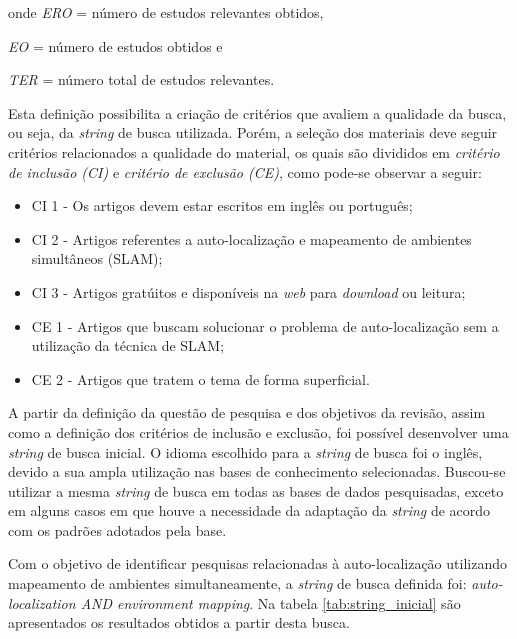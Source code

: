 		onde \textit{ERO} = número de estudos relevantes obtidos,
		
		\textit{EO} = número de estudos obtidos e

		\textit{TER} = número total de estudos relevantes.

		Esta definição possibilita a criação de critérios que avaliem a qualidade da busca, ou seja, da \textit{string} de busca utilizada. Porém, a seleção dos materiais deve seguir critérios relacionados a qualidade do material, os quais são divididos em \textit{critério de inclusão (CI)} e \textit{critério de exclusão (CE)}, como pode-se observar a seguir:

		\begin{itemize}
			\item CI 1 - Os artigos devem estar escritos em inglês ou português;
			\item CI 2 - Artigos referentes a auto-localização e mapeamento de ambientes simultâneos (SLAM);
			\item CI 3 - Artigos gratúitos e disponíveis na \textit{web} para \textit{download} ou leitura;
			\item CE 1 - Artigos que buscam solucionar o problema de auto-localização sem a utilização da técnica de SLAM;
			\item CE 2 - Artigos que tratem o tema de forma superficial. 
		\end{itemize}

		A partir da definição da questão de pesquisa e dos objetivos da revisão, assim como a definição dos critérios de inclusão e exclusão, foi possível desenvolver uma \textit{string} de busca inicial. O idioma escolhido para a \textit{string} de busca foi o inglês, devido a sua ampla utilização nas bases de conhecimento selecionadas. Buscou-se utilizar a mesma \textit{string} de busca em todas as bases de dados pesquisadas, exceto em alguns casos em que houve a necessidade da adaptação da \textit{string} de acordo com os padrões adotados pela base.


			Com o objetivo de identificar pesquisas relacionadas à auto-localização utilizando mapeamento de ambientes simultaneamente, a \textit{string} de busca definida foi: \textit{auto-localization AND environment mapping}. Na tabela \ref{tab:string_inicial} são apresentados os resultados obtidos a partir desta busca.

